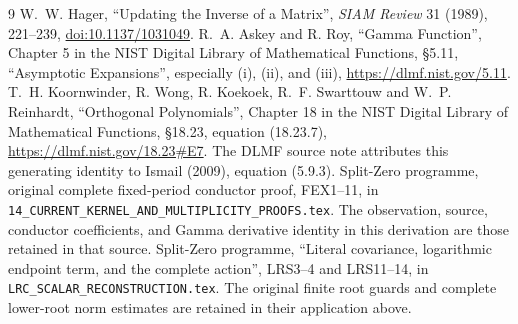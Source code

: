 \documentclass[11pt,a4paper]{article}
\begin{document}
\begin{thebibliography}{9}
 W.~W. Hager, ``Updating the Inverse of a Matrix'',
\emph{SIAM Review} 31 (1989), 221--239,
\href{https://doi.org/10.1137/1031049}{doi:10.1137/1031049}.
 R.~A. Askey and R. Roy, ``Gamma Function'',
Chapter 5 in the NIST Digital Library of Mathematical Functions,
\S5.11, ``Asymptotic Expansions'', especially (i), (ii), and (iii),
\url{https://dlmf.nist.gov/5.11}.
 T.~H. Koornwinder, R. Wong, R. Koekoek,
R.~F. Swarttouw and W.~P. Reinhardt, ``Orthogonal Polynomials'',
Chapter 18 in the NIST Digital Library of Mathematical Functions,
\S18.23, equation (18.23.7),
\url{https://dlmf.nist.gov/18.23#E7}. The DLMF source note attributes
this generating identity to Ismail (2009), equation (5.9.3).
 Split-Zero programme, original complete
fixed-period conductor proof, FEX1--11, in
\texttt{14\_CURRENT\_KERNEL\_AND\_MULTIPLICITY\_PROOFS.tex}.
The observation, source, conductor coefficients, and Gamma derivative
identity in this derivation are those retained in that source.
 Split-Zero programme, ``Literal covariance,
logarithmic endpoint term, and the complete action'', LRS3--4 and
LRS11--14, in \texttt{LRC\_SCALAR\_RECONSTRUCTION.tex}.
The original finite root guards and complete lower-root norm estimates
are retained in their application above.
\end{thebibliography}
\end{document}
